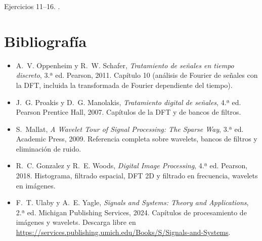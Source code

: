 \documentclass[11pt,a4paper]{scrartcl}
\begin{document}
\begin{flushright}\small\color{pdsgris}Ejercicios 11–16. .\end{flushright}

\section*{Bibliografía}

\begin{itemize}
  \item A.~V. Oppenheim y R.~W. Schafer, \emph{Tratamiento de señales en tiempo discreto}, 3.ª ed. Pearson, 2011. Capítulo 10 (análisis de Fourier de señales con la DFT, incluida la transformada de Fourier dependiente del tiempo).
  \item J.~G. Proakis y D.~G. Manolakis, \emph{Tratamiento digital de señales}, 4.ª ed. Pearson Prentice Hall, 2007. Capítulos de la DFT y de bancos de filtros.
  \item S.~Mallat, \emph{A Wavelet Tour of Signal Processing: The Sparse Way}, 3.ª ed. Academic Press, 2009. Referencia completa sobre wavelets, bancos de filtros y eliminación de ruido.
  \item R.~C. Gonzalez y R.~E. Woods, \emph{Digital Image Processing}, 4.ª ed. Pearson, 2018. Histograma, filtrado espacial, DFT 2D y filtrado en frecuencia, wavelets en imágenes.
  \item F.~T. Ulaby y A.~E. Yagle, \emph{Signals and Systems: Theory and Applications}, 2.ª ed. Michigan Publishing Services, 2024. Capítulos de procesamiento de imágenes y wavelets. Descarga libre en\\ \url{https://services.publishing.umich.edu/Books/S/Signals-and-Systems}.
\end{itemize}
\end{document}
